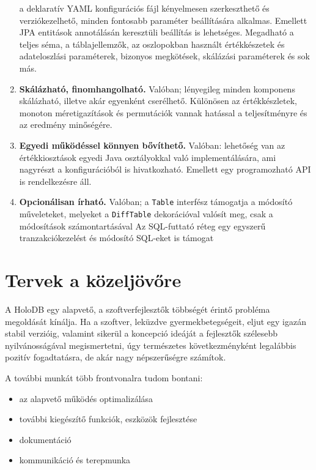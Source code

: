 \documentclass[
    parspace,
    noindent,
    nohyp,
]{elteiktdk}[2023/04/10]
\begin{document}
\begin{enumerate}
          a deklaratív YAML konfigurációs fájl kényelmesen szerkeszthető és verziókezelhető,
          minden fontosabb paraméter beállítására alkalmas.
          Emellett JPA entitások annotálásán keresztüli beállítás is lehetséges.
          Megadható a teljes séma,
          a táblajellemzők, az oszlopokban használt értékkészetek és adateloszlási paraméterek,
          bizonyos megkötések, skálázási paraméterek és sok más.
    \item \textbf{Skálázható, finomhangolható.} Valóban;
          lényegileg minden komponens skálázható, illetve akár egyenként cserélhető.
          Különösen az értékkészletek, monoton méretigazítások és permutációk
          vannak hatással a teljesítményre és az eredmény minőségére.
    \item \textbf{Egyedi működéssel könnyen bővíthető.} Valóban:
          lehetőség van az értékkiosztások egyedi Java osztályokkal való implementálására,
          ami nagyrészt a konfigurációból is hivatkozható.
          Emellett egy programozható API is rendelkezésre áll.
    \item \textbf{Opcionálisan írható.} Valóban;
          a \texttt{Table} interfész támogatja a módosító műveleteket,
          melyeket a \texttt{DiffTable} dekorációval valósít meg,
          csak a módosítások számontartásával
          Az SQL-futtató réteg egy egyszerű tranzakciókezelést
          és módosító SQL-eket is támogat
\end{enumerate}


\section{Tervek a közeljövőre}

A HoloDB egy alapvető, a szoftverfejlesztők többségét érintő probléma megoldását kínálja.
Ha a szoftver, leküzdve gyermekbetegségeit, eljut egy igazán stabil verzióig,
valamint sikerül a koncepció ideáját a fejlesztők szélesebb nyilvánosságával megismertetni,
úgy természetes következményként legalábbis pozitív fogadtatásra,
de akár nagy népszerűségre számítok.

A további munkát több frontvonalra tudom bontani:

\begin{itemize}
    \item az alapvető működés optimalizálása
    \item további kiegészítő funkciók, eszközök fejlesztése
    \item dokumentáció
    \item kommunikáció és terepmunka
\end{itemize}
\end{document}
